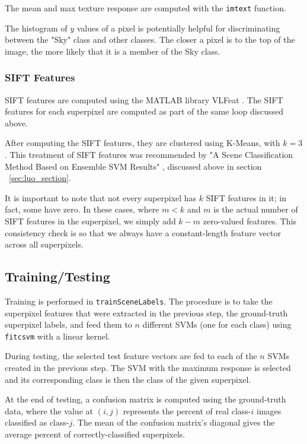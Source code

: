\documentclass[10pt,twocolumn,letterpaper]{article}
\begin{document}
The mean and max texture response are computed with the \texttt{imtext} function.

The histogram of $y$ values of a pixel is potentially helpful for discriminating between the "Sky" class and other classes. The closer a pixel is to the top of the image, the more likely that it is a member of the Sky class.

\subsubsection{SIFT Features}

SIFT features are computed using the MATLAB library VLFeat \cite{vlfeat}.  The SIFT features for each superpixel are computed as part of the same loop discussed above.

After computing the SIFT features, they are clustered using K-Means, with $k=3$.  This treatment of SIFT features was recommended by "A Scene Classification Method Based on Ensemble SVM Results" \cite{luo}, discussed above in section ~\ref{sec:luo_section}.

It is important to note that not every superpixel has $k$ SIFT features in it; in fact, some have zero.  In these cases, where $m<k$ and $m$ is the actual number of SIFT features in the superpixel, we simply add $k-m$ zero-valued features.  This consistency check is so that we always have a constant-length feature vector across all superpixels.

\subsection{Training/Testing}

Training is performed in \texttt{trainSceneLabels}.  The procedure is to take the superpixel features that were extracted in the previous step, the ground-truth superpixel labels, and feed them to $n$ different SVMs (one for each class) using \texttt{fitcsvm} with a linear kernel.

During testing, the selected test feature vectors are fed to each of the $n$ SVMs created in the previous step. The SVM with the maximum response is selected and its corresponding class is then the class of the given superpixel.

At the end of testing, a confusion matrix is computed using the ground-truth data, where the value at $(i,j)$ represents the percent of real class-$i$ images classified as class-$j$.  The mean of the confusion matrix's diagonal gives the average percent of correctly-classified superpixels.
\end{document}
